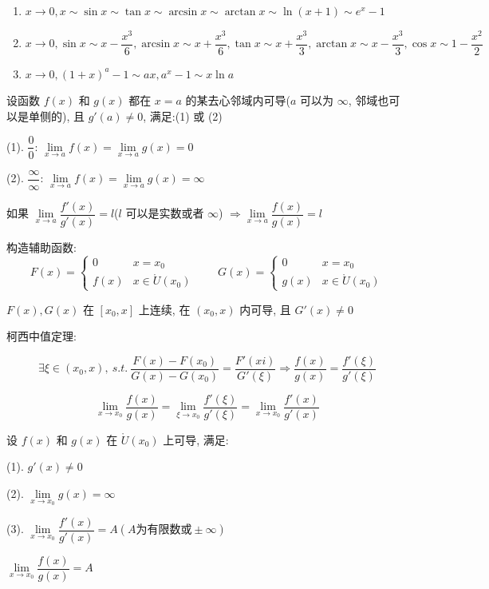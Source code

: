 \begin{corollary}[等价无穷小]
	\begin{enumerate}
		\item $x\to 0, x\sim \sin x\sim \tan x\sim \arcsin x\sim \arctan x\sim \ln(x+1)\sim e^{x}-1$
		\item $x\to 0, \sin x\sim x - \dfrac{x^{3}}{6}, \arcsin x\sim x+\dfrac{x^{3}}{6}, \tan x\sim x+\dfrac{x^{3}}{3}, \arctan x\sim x-\dfrac{x^{3}}{3},\cos x\sim 1-\dfrac{x^{2}}{2}$
		\item $x\to 0, (1+x)^{a}-1\sim ax, a^{x}-1\sim x\ln a$
	\end{enumerate}
\end{corollary}
\begin{theorem}[洛必达法则]
	设函数 $f(x)$ 和 $g(x)$ 都在 $x=a$ 的某去心邻域内可导($a$ 可以为 $\infty$, 邻域也可以是单侧的), 且 $g'(a)\neq 0$, 满足:(1) 或 (2)

	(1). $\dfrac{0}{0}$: $\lim\limits_{x\to a}f(x)=\lim\limits_{x\to a}g(x)=0$

	(2). $\dfrac{\infty}{\infty}$: $\lim\limits_{x\to a}f(x)=\lim\limits_{x\to a}g(x)=\infty$

	如果 $\lim\limits_{x\to a}\dfrac{f'(x)}{g'(x)}=l$($l$ 可以是实数或者 $\infty$) $\Rightarrow \lim\limits_{x\to a}\dfrac{f(x)}{g(x)}=l$
\end{theorem}
\begin{anymark}[证明]
	构造辅助函数: 
	$$F(x) = \begin{cases} 
		0 & x=x_{0}  \\ 
		f(x) & x\in\mathring{U}(x_{0}) 
	\end{cases}\qquad 
	G(x) = \begin{cases}
		 0 & x=x_{0}  \\ 
		 g(x) & x\in\mathring{U}(x_{0}) 
	\end{cases}$$

	$F(x),G(x)$ 在 $[x_{0},x]$ 上连续, 在 $(x_{0},x)$ 内可导, 且 $G'(x)\neq 0$
	
	柯西中值定理:
	
	$$\exists \xi\in (x_{0},x),\ s.t.\ \dfrac{F(x)-F(x_{0})}{G(x)-G(x_{0})}= \dfrac{F'(xi)}{G'(\xi)}
	\Rightarrow \dfrac{f(x)}{g(x)} = \dfrac{f'(\xi)}{g'(\xi)}$$

	$$\lim\limits_{x\to x_{0}}\dfrac{f(x)}{g(x)} = \lim\limits_{\xi\to x_{0}}\dfrac{f'(\xi)}{g'(\xi)} = \lim\limits_{x\to x_{0}}\dfrac{f'(x)}{g'(x)}$$
\end{anymark}
\begin{theorem}[广义洛必达定理]
	设 $f(x)$ 和 $g(x)$ 在 $\mathring{U}(x_{0})$ 上可导, 满足:

	(1). $g'(x)\neq 0$

	(2). $\lim\limits_{x\to x_{0}}g(x) =\infty$

	(3). $\lim\limits_{x\to x_{0}}\dfrac{f'(x)}{g'(x)}=A(A\text{为有限数或}\pm\infty)$

	$\lim\limits_{x\to x_{0}}\dfrac{f(x)}{g(x)}=A$
\end{theorem}
